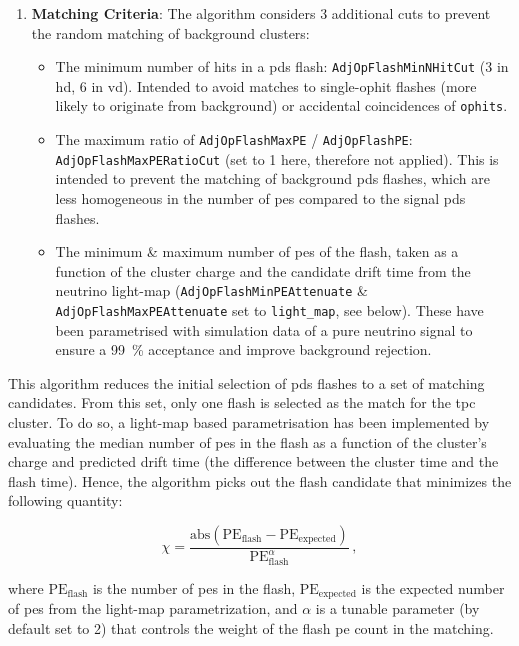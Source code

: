 \begin{enumerate}
    \item\textbf{Matching Criteria}: The algorithm considers 3 additional cuts to prevent the random matching of background clusters:
    \begin{itemize}
        \item The minimum number of hits in a \gls{pds} flash: \texttt{AdjOpFlashMinNHitCut} (3 in \gls{hd}, 6 in \gls{vd}). Intended to avoid matches to single-ophit flashes (more likely to originate from background) or accidental coincidences of \texttt{ophits}.
        \item The maximum ratio of \texttt{AdjOpFlashMaxPE} / \texttt{AdjOpFlashPE}: \texttt{AdjOpFlashMaxPERatioCut} (set to 1 here, therefore not applied). This is intended to prevent the matching of background \gls{pds} flashes, which are less homogeneous in the number of \gls{pe}s compared to the signal \gls{pds} flashes.
        \item The minimum \& maximum number of \gls{pe}s of the flash, taken as a function of the cluster charge and the candidate drift time from the neutrino light-map (\texttt{AdjOpFlashMinPEAttenuate} \& \texttt{AdjOpFlashMaxPEAttenuate} set to \texttt{light\_map}, see below). These have been parametrised with simulation data of a pure neutrino signal to ensure a \SI{99}{\percent} acceptance and improve background rejection.
    \end{itemize}
\end{enumerate}

This algorithm reduces the initial selection of \gls{pds} flashes to a set of matching candidates. From this set, only one flash is selected as the match for the \gls{tpc} cluster. To do so, a light-map based parametrisation has been implemented by evaluating the median number of \gls{pe}s in the flash as a function of the cluster's charge and predicted drift time (the difference between the cluster time and the flash time). Hence, the algorithm picks out the flash candidate that minimizes the following quantity:

\begin{equation}
    \chi = \frac{\text{abs}(\text{PE}_\text{flash} - \text{PE}_\text{expected})}{\text{PE}_\text{flash}^\alpha}\,,
\end{equation}

where \( \text{PE}_\text{flash} \) is the number of \gls{pe}s in the flash, \( \text{PE}_\text{expected} \) is the expected number of \gls{pe}s from the light-map parametrization, and \( \alpha \) is a tunable parameter (by default set to 2) that controls the weight of the flash \gls{pe} count in the matching.

